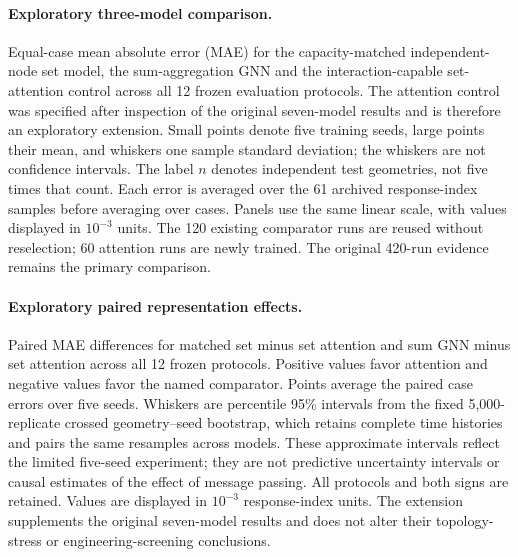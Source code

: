 \paragraph{Exploratory three-model comparison.}
Equal-case mean absolute error (MAE) for the capacity-matched independent-node set model, the sum-aggregation GNN and the interaction-capable set-attention control across all 12 frozen evaluation protocols. The attention control was specified after inspection of the original seven-model results and is therefore an exploratory extension. Small points denote five training seeds, large points their mean, and whiskers one sample standard deviation; the whiskers are not confidence intervals. The label $n$ denotes independent test geometries, not five times that count. Each error is averaged over the 61 archived response-index samples before averaging over cases. Panels use the same linear scale, with values displayed in $10^{-3}$ units. The 120 existing comparator runs are reused without reselection; 60 attention runs are newly trained. The original 420-run evidence remains the primary comparison.

\paragraph{Exploratory paired representation effects.}
Paired MAE differences for matched set minus set attention and sum GNN minus set attention across all 12 frozen protocols. Positive values favor attention and negative values favor the named comparator. Points average the paired case errors over five seeds. Whiskers are percentile 95\% intervals from the fixed 5,000-replicate crossed geometry--seed bootstrap, which retains complete time histories and pairs the same resamples across models. These approximate intervals reflect the limited five-seed experiment; they are not predictive uncertainty intervals or causal estimates of the effect of message passing. All protocols and both signs are retained. Values are displayed in $10^{-3}$ response-index units. The extension supplements the original seven-model results and does not alter their topology-stress or engineering-screening conclusions.
